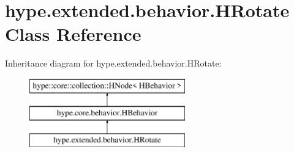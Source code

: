 \hypertarget{classhype_1_1extended_1_1behavior_1_1_h_rotate}{\section{hype.\-extended.\-behavior.\-H\-Rotate Class Reference}
\label{classhype_1_1extended_1_1behavior_1_1_h_rotate}
}
Inheritance diagram for hype.\-extended.\-behavior.\-H\-Rotate\-:\begin{figure}[H]
\begin{center}
\leavevmode
\includegraphics[height=3.000000cm]{classhype_1_1extended_1_1behavior_1_1_h_rotate}
\end{center}
\end{figure}
